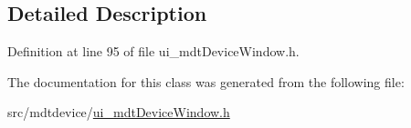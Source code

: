 \subsection{Detailed Description}


Definition at line 95 of file ui\-\_\-mdt\-Device\-Window.\-h.



The documentation for this class was generated from the following file\-:\begin{DoxyCompactItemize}
\item 
src/mdtdevice/\hyperlink{ui__mdt_device_window_8h}{ui\-\_\-mdt\-Device\-Window.\-h}\end{DoxyCompactItemize}
